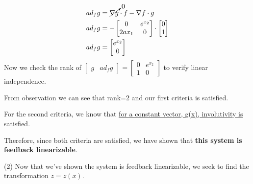 \documentclass{article}
\begin{document}
  \begin{align*}
    ad_fg &= \cancelto{0}{\nabla g} \cdot f - \nabla f \cdot g \\
    ad_fg &= -\begin{bmatrix}
                0 & e^{x_2} \\
                2ax_1 & 0
              \end{bmatrix} \cdot
              \begin{bmatrix}
                0 \\
                1
              \end{bmatrix} \\
    ad_fg &= \begin{bmatrix}
                e^{x_2} \\
                0
              \end{bmatrix}
  \end{align*}
  Now we check the rank of $\begin{bmatrix} 
    g & ad_fg
  \end{bmatrix} =
  \begin{bmatrix}
    0 & e^{x_2} \\
    1 & 0
  \end{bmatrix}$ to verify linear independence. \newline

  \noindent From observation we can see that rank=2 and our first criteria is satisfied.
  \newline \newline

  \noindent For the second criteria, we know that \underline{for a constant vector, g(x),
  involutivity is satisfied.} \newline \newline

  \noindent Therefore, since both criteria are satisfied, we have shown that \textbf{this
    system is feedback linearizable}. \newpage

  (2) Now that we've shown the system is feedback linearizable, we seek to
  find the transformation $z=z(x)$.
  
\end{document}
